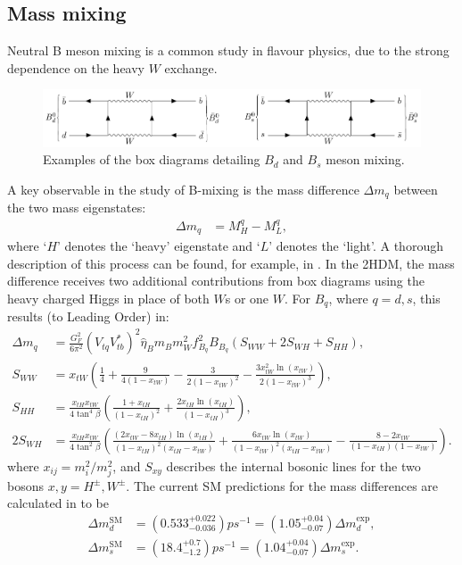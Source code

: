\documentclass[a4paper,12pt]{article}
\begin{document}
\subsection{Mass mixing}
\label{subsec:mix}
Neutral B meson mixing is a common study in flavour physics, due to the strong dependence on the heavy $W$ exchange. 
\begin{figure}[H]
    \centering
    \includegraphics[scale=0.95,trim=12em 45em 10em 12em]{bmix.pdf}
    \caption{\label{fig:bmix} Examples of the box diagrams detailing $B_d$ and $B_s$ meson mixing.}
\end{figure}
A key observable in the study of B-mixing is the mass difference $\Delta m_q$ between the two mass eigenstates:
\begin{align}
    \Delta m_q &= M_H^q - M_L^q,
\end{align}
where `$H$' denotes the `heavy' eigenstate and `$L$' denotes the `light'. 
A thorough description of this process can be found, for example, in \cite{mix15}.
In the 2HDM, the mass difference receives two additional contributions from box diagrams using the heavy charged Higgs in place of both $W$s or one $W$. 
For $B_q$, where $q=d,s$, this results (to Leading Order) in:
\begin{align}
    \Delta m_q &= \frac{G_F^2}{6\pi^2}(V_{tq}V_{tb}^*)^2\hat{\eta}_Bm_Bm_W^2f_{B_q}^2B_{B_q}(S_{WW}+2S_{WH}+S_{HH}), \\
    S_{WW} &= x_{tW}\left(\frac14+\frac{9}{4(1-x_{tW})}-\frac{3}{2(1-x_{tW})^2}-\frac{3x_{tW}^2\ln(x_{tW})}{2(1-x_{tW})^3}\right), \\
    S_{HH} &= \frac{x_{tH}x_{tW}}{4\tan^4\beta}\left(\frac{1+x_{tH}}{(1-x_{tH})^2}+\frac{2x_{tH}\ln(x_{tH})}{(1-x_{tH})^3}\right),\\
    2S_{WH} &= \frac{x_{tH}x_{tW}}{4\tan^2\beta}\left(\frac{(2x_{tW}-8x_{tH})\ln(x_{tH})}{(1-x_{tH})^2(x_{tH}-x_{tW})}+\frac{6x_{tW}\ln(x_{tW})}{(1-x_{tW})^2(x_{tH}-x_{tW})}-\frac{8-2x_{tW}}{(1-x_{tH})(1-x_{tW})}\right).
\end{align}
where $x_{ij} = m_i^2/m_j^2$, and $S_{xy}$ describes the internal bosonic lines for the two bosons $x,y = H^\pm,W^\pm$.
The current SM predictions for the mass differences are calculated in \cite{bmix} to be
\begin{align}
    \Delta m^{\text{SM}}_d &= \left(0.533^{+0.022}_{-0.036}\right)ps^{-1} = \left(1.05^{+0.04}_{-0.07}\right)\Delta m_d^{\text{exp}}, \\
    \Delta m^{\text{SM}}_s &= \left(18.4^{+0.7}_{-1.2}\right)ps^{-1} = \left(1.04^{+0.04}_{-0.07}\right)\Delta m_s^{\text{exp}}.
\end{align}
\end{document}
